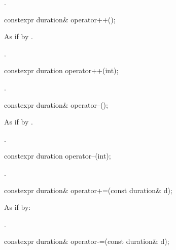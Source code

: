 \begin{itemdescr}
\pnum
\returns {}.
\end{itemdescr}

%
\begin{itemdecl}
constexpr duration& operator++();
\end{itemdecl}

\begin{itemdescr}
\pnum
\effects As if by .

\pnum
\returns {}.
\end{itemdescr}

%
\begin{itemdecl}
constexpr duration operator++(int);
\end{itemdecl}

\begin{itemdescr}
\pnum
\returns {}.
\end{itemdescr}

%
\begin{itemdecl}
constexpr duration& operator--();
\end{itemdecl}

\begin{itemdescr}
\pnum
\effects As if by .

\pnum
\returns {}.
\end{itemdescr}

%
\begin{itemdecl}
constexpr duration operator--(int);
\end{itemdecl}

\begin{itemdescr}
\pnum
\returns {}.
\end{itemdescr}

%
\begin{itemdecl}
constexpr duration& operator+=(const duration& d);
\end{itemdecl}

\begin{itemdescr}
\pnum
\effects As if by: 

\pnum
\returns {}.
\end{itemdescr}

%
\begin{itemdecl}
constexpr duration& operator-=(const duration& d);
\end{itemdecl}

